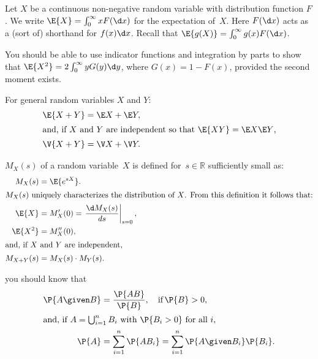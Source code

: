 \documentclass[queueing_book]{subfiles}
\begin{document}
Let $X$ be a continuous non-negative random variable with distribution function $F$.
We write $ \E{X} = \int_0^\infty x F(\d x)$ for the expectation of~$X$.
Here $F(\d x)$ acts as a (sort of) shorthand for $f(x) \d x$.
Recall that $\E{g(X)} = \int_0^\infty g(x) F(\d x)$.

You should be able to use indicator functions and integration by parts to show that $\E{X^2} = 2\int_0^\infty y G(y) \d y$, where $G(x) = 1- F(x)$, provided the second moment exists.

For general random variables $X$ and $Y$:
\begin{align}
  \E{X+Y} &= \E X + \E Y, \label{eq:95}\\
\intertext{and, if $X$ and $Y$ are independent so that $\E{XY} = \E X \E Y$,}
  \V{X+Y} &= \V X + \V Y. \label{eq:94}
\end{align}

 $M_X(s)$ of a random variable~$X$ is defined for~$s\in \mathbb{R}$ sufficiently small as:
\begin{subequations}
\begin{align}
 M_X(s) &= \E{e^{s X}}. \label{eq:75}\\
\intertext{$M_X(s)$  uniquely characterizes the distribution of $X$. From this definition it follows that:}
 \E{X} &= M_{X}'(0) = \left.\frac{\d M_{X}(s)}{d s}\right|_{s=0},\label{eq:69}\\
\E{X^2} &= M_{X}''(0), \label{eq:64}\\
\intertext{and, if $X$ and $Y$ are independent,}
M_{X+Y}(s) &= M_X(s)\cdot M_Y(s). \label{eq:73}
\end{align}
\end{subequations}


 you should know that
\begin{subequations}\label{eq:70}
\begin{align}
\P{A\given B} & = \frac{\P{AB}}{\P{B}}, \quad\text{if}\, \P{B}>0, \\
\intertext{and, if $A=\bigcup_{i=1}^n B_i$ with $\P{B_i>0}$ for all $i$,}
 \P{A} &= \sum_{i=1}^n \P{A B_i} = \sum_{i=1}^n \P{A\given B_i} \P{B_i}.
\end{align}
\end{subequations}
\end{document}
